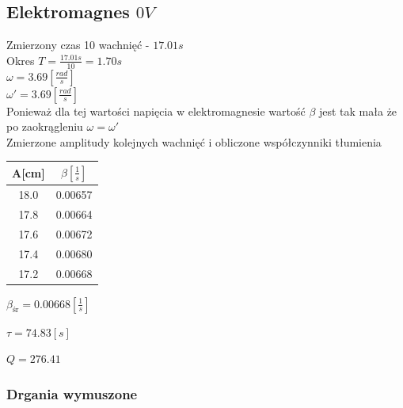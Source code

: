 \documentclass[]{article}
\begin{document}
	\subsection{Elektromagnes $0V$}
	Zmierzony czas 10 wachnięć - $17.01s$\\
	Okres $T = \frac{17.01s}{10}=1.70s$\\
	$\omega = 3.69 \left[ \frac{rad}{s}\right]$\\
	$\omega' = 3.69 \left[ \frac{rad}{s}\right]$\\
	Ponieważ dla tej wartości napięcia w elektromagnesie wartość $\beta$ jest tak mała że po zaokrągleniu $\omega=\omega'$\\
	Zmierzone amplitudy kolejnych wachnięć i obliczone współczynniki tłumienia
	\begin{table}[h]
		\begin{tabular}{|c|c|}
			\hline 
			A[cm] & $\beta\left[ \frac{1}{s}\right] $ \\ 
			\hline 
			18.0 & 0.00657 \\ 
			\hline 
			17.8 & 0.00664 \\ 
			\hline 
			17.6 & 0.00672 \\ 
			\hline 
			17.4 & 0.00680 \\ 
			\hline 
			17.2 & 0.00668 \\ 
			\hline 
		\end{tabular} 
	\end{table}

	$\beta_{\text{śr}} = 0.00668 \left[ \frac{1}{s}\right] $
	
	$\tau=74.83[s]$
	
	$Q = 276.41$
	
	\subsubsection{Drgania wymuszone}
	
\end{document}
